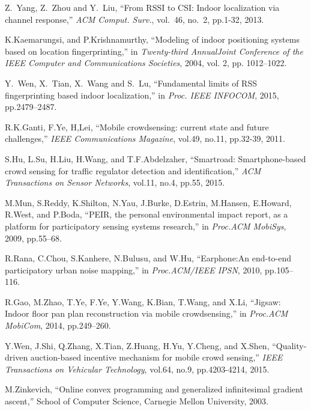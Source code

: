 \documentclass[10pt,conference,compsocconf,letterpaper]{IEEEtran}
\begin{document}
\begin{thebibliography}{99}

Z.~Yang, Z.~Zhou and Y.~Liu, ``From RSSI to CSI: Indoor localization via channel response,'' \emph{ACM Comput. Surv.}, vol.~46, no.~2, pp.1-32, 2013.

K.Kaemarungsi, and P.Krishnamurthy, ``Modeling of indoor positioning systems based on location fingerprinting,'' in \emph{Twenty-third AnnualJoint Conference of the IEEE Computer and Communications Societies}, 2004, vol. 2, pp. 1012--1022.

Y.~Wen, X.~Tian, X.~Wang and S.~Lu, ``Fundamental limits of RSS fingerprinting based indoor localization,'' in \emph{Proc. IEEE INFOCOM}, 2015, pp.2479--2487.

R.K.Ganti, F.Ye, H,Lei, ``Mobile crowdsensing: current state and future challenges,'' \emph{IEEE Communications Magazine}, vol.49, no.11, pp.32-39, 2011.

S.Hu, L.Su, H.Liu, H.Wang, and T.F.Abdelzaher, ``Smartroad: Smartphone-based crowd sensing for traffic regulator detection and identification,'' \emph{ACM Transactions on Sensor Networks}, vol.11, no.4, pp.55, 2015.

M.Mun, S.Reddy, K.Shilton, N.Yau, J.Burke, D.Estrin, M.Hansen, E.Howard, R.West, and P.Boda, ``PEIR, the personal environmental impact report, as a platform for participatory sensing systems research,'' in \emph{Proc.ACM MobiSys}, 2009, pp.55--68.

R.Rana, C.Chou, S.Kanhere, N.Bulusu, and W.Hu, ``Earphone:An end-to-end participatory urban noise mapping,'' in \emph{Proc.ACM/IEEE IPSN}, 2010, pp.105--116.

R.Gao, M.Zhao, T.Ye, F.Ye, Y.Wang, K.Bian, T.Wang, and X.Li, ``Jigsaw: Indoor floor pan plan reconstruction via mobile crowdsensing,'' in \emph{Proc.ACM MobiCom}, 2014, pp.249--260.

Y.Wen, J.Shi, Q.Zhang, X.Tian, Z.Huang, H.Yu, Y.Cheng, and X.Shen, ``Quality-driven auction-based incentive mechanism for mobile crowd sensing,'' \emph{IEEE Transactions on Vehicular Technology}, vol.64, no.9, pp.4203-4214, 2015.

M.Zinkevich, ``Online convex programming and generalized infinitesimal gradient ascent,'' School of Computer Science, Carnegie Mellon University, 2003.


\end{thebibliography}
\end{document}
